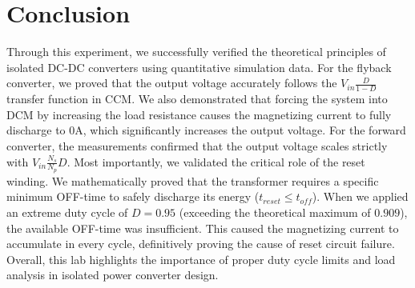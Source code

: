 \documentclass{article}
\begin{document}
\section*{Conclusion}
Through this experiment, we successfully verified the theoretical principles of isolated DC-DC converters using quantitative simulation data. For the flyback converter, we proved that the output voltage accurately follows the $V_{in} \frac{D}{1-D}$ transfer function in CCM. We also demonstrated that forcing the system into DCM by increasing the load resistance causes the magnetizing current to fully discharge to 0A, which significantly increases the output voltage.
For the forward converter, the measurements confirmed that the output voltage scales strictly with $V_{in} \frac{N_s}{N_p} D$. Most importantly, we validated the critical role of the reset winding. We mathematically proved that the transformer requires a specific minimum OFF-time to safely discharge its energy ($t_{reset} \le t_{off}$). When we applied an extreme duty cycle of $D=0.95$ (exceeding the theoretical maximum of $0.909$), the available OFF-time was insufficient. This caused the magnetizing current to accumulate in every cycle, definitively proving the cause of reset circuit failure. Overall, this lab highlights the importance of proper duty cycle limits and load analysis in isolated power converter design.
\end{document}
